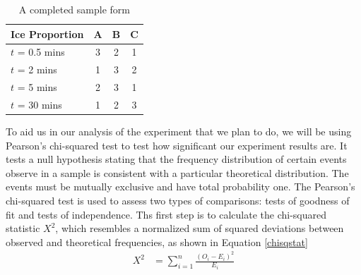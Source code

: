 \documentclass[oneside,12pt]{report}
\begin{document}
\begin{table}[ h]
\centering
\begin{tabular}{ l | c|c|c }
  Ice Proportion & A  & B & C  \\
\hline  
$t$ = 0.5 mins & 3&2 &1\\ 
\hline  
$t$ = 2 mins &1 &3 &2\\ 
\hline  
$t$ = 5 mins  &2 &3 &1\\ 
\hline  
$t$ = 30 mins &1 &2 &3\\ 
\hline  
   
 \end{tabular}
\caption{A completed sample form}

\end{table}

\noindent To aid us in our analysis of the experiment that we plan to do, we will be using Pearson's chi-squared test to test how significant our experiment results are. It tests a null hypothesis stating that the frequency distribution of certain events observe in a sample is consistent with a particular theoretical distribution. The events must be mutually exclusive and have total probability one.
\vspace{12pt}
\newline
The Pearson's chi-squared test is used to assess two types of comparisons: tests of goodness of fit and tests of independence. Ths first step is to calculate the chi-squared statistic $ X^2$, which resembles a normalized sum of squared deviations between observed and theoretical frequencies, as shown in Equation \eqref{chisqstat} 
\begin{align}
X^2 &= \sum_{i=1}^{n} {\frac{(O_{i}-E_{i})^2}{E_{i}}} \label{chisqstat}
\end{align}
\end{document}
